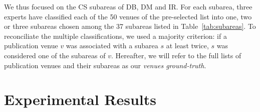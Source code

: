 \documentclass[msc]{ppgccufmg}
\begin{document}
We thus focused on the CS subareas of  DB, DM and IR. For each subarea, three experts have classified each of the 50 venues of the pre-selected list into one, two or three subareas chosen among the 37 subareas listed in Table~\ref{tab:subareas}. To reconciliate the multiple classifications, we used a majority criterion: if a publication venue $v$ was associated with a subarea $s$ at least twice, $s$ was considered one of the subareas of $v$. Hereafter, we will refer to the full lists of publication venues and their subareas as our \textit{venues ground-truth}.



%
%
%
%
%



\chapter{Experimental Results}\label{sec:results}
\end{document}
